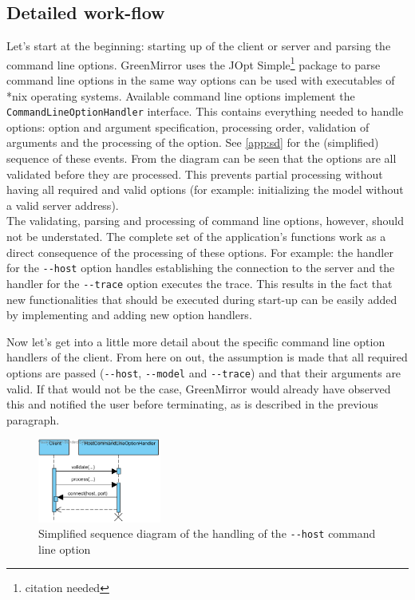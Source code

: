\documentclass[a4paper]{article}
\begin{document}
	\subsection{Detailed work-flow}\label{subsec:detailedworkflow}
	Let's start at the beginning: starting up of the client or server and parsing the command line options. GreenMirror uses the JOpt Simple\footnote{citation needed} package to parse command line options in the same way options can be used with executables of *nix operating systems. Available command line options implement the \lstinline{CommandLineOptionHandler} interface. This contains everything needed to handle options: option and argument specification, processing order, validation of arguments and the processing of the option. See \cref{app:sd} for the (simplified) sequence of these events. From the diagram can be seen that the options are all validated before they are processed. This prevents partial processing without having all required and valid options (for example: initializing the model without a valid server address).\\
	The validating, parsing and processing of command line options, however, should not be understated. The complete set of the application's functions work as a direct consequence of the processing of these options. For example: the handler for the \lstinline{--host} option handles establishing the connection to the server and the handler for the \lstinline{--trace} option executes the trace. This results in the fact that new functionalities that should be executed during start-up can be easily added by implementing and adding new option handlers.
	
	Now let's get into a little more detail about the specific command line option handlers of the client. From here on out, the assumption is made that all required options are passed (\lstinline{--host}, \lstinline{--model} and \lstinline{--trace}) and that their arguments are valid. If that would not be the case, GreenMirror would already have observed this and notified the user before terminating, as is described in the previous paragraph.
	
	\begin{figure}\vspace{-20pt}
		\begin{center}
			\includegraphics[width=0.36\textwidth]{diagrams/SD_client_host}
		\end{center}
		\vspace{-20pt}\caption{Simplified sequence diagram of the handling of the \lstinline{--host} command line option}\vspace{-15pt}
		\label{fig:sd_client_host}
	\end{figure}
	
\end{document}
